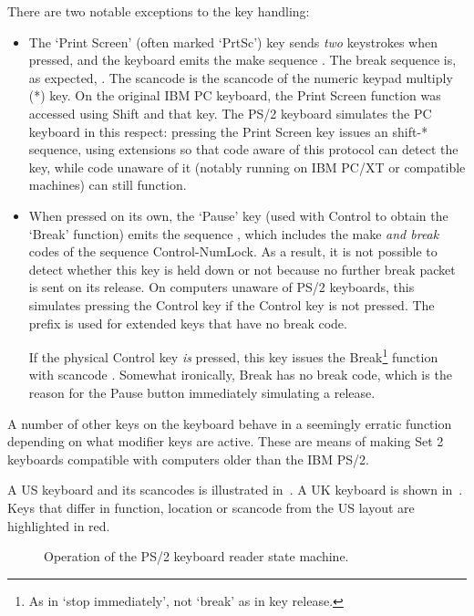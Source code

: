 There are two notable exceptions to the key handling:

\begin{itemize}
\item The ‘Print Screen’ (often marked ‘PrtSc’) key sends {\em two\/}
  keystrokes when pressed, and the keyboard emits the make sequence . The break sequence is, as expected, . The
  scancode  is the scancode of the numeric keypad multiply (\textsf{*})
  key. On the original IBM PC keyboard, the Print Screen function was accessed
  using Shift and that key. The PS/2 keyboard simulates the PC keyboard in this
  respect: pressing the Print Screen key issues an shift-\textsf{*} sequence,
  using  extensions so that code aware of this protocol can detect the
  key, while code unaware of it (notably running on IBM PC/XT or compatible
  machines) can still function.

\item When pressed on its own, the ‘Pause’ key (used with Control to obtain the
  ‘Break’ function) emits the sequence , which
  includes the make {\em and break\/} codes of the sequence
  \textsf{Control-NumLock}. As a result, it is not possible to detect whether
  this key is held down or not because no further break packet is sent on its
  release. On computers unaware of PS/2 keyboards, this simulates pressing the
  Control key if the Control key is not pressed. The prefix  is used
  for extended keys that have no break code.

  If the physical Control key {\em is\/} pressed, this key issues the
  Break\footnote{As in ‘stop immediately’, not ‘break’ as in key release.}
  function with scancode . Somewhat ironically, Break has no break
  code, which is the reason for the Pause button immediately simulating a
  release.
\end{itemize}

A number of other keys on the keyboard behave in a seemingly erratic function
depending on what modifier keys are active. These are means of making Set 2
keyboards compatible with computers older than the IBM PS/2.

A US keyboard and its scancodes is illustrated in~. A
UK keyboard is shown in~. Keys that differ in
function, location or scancode from the US layout are highlighted in
red.


\begin{figure}
  \centering
  \caption[PS/2 Set 2 State Machine
    Flowchart]{\label{fig:kbd-key-fsm-flowchart}Operation of the PS/2
    keyboard reader state machine.}
\end{figure}

